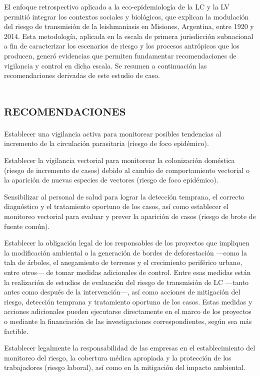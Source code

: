 \documentclass{article}
\begin{document}
El enfoque retrospectivo aplicado a la eco-epidemiología de la LC y la LV
permitió integrar los contextos sociales y biológicos, que explican la
modulación del riesgo de transmisión de la leishmaniasis en Misiones, Argentina,
entre 1920 y 2014. Esta metodología, aplicada en la escala de primera
jurisdicción subnacional a fin de caracterizar los escenarios de riesgo y los
procesos antrópicos que los producen, generó evidencias que permiten fundamentar
recomendaciones de vigilancia y control en dicha escala. Se resumen a
continuación las recomendaciones derivadas de este estudio de caso.

\section{\textsc{recomendaciones}}

Establecer una vigilancia activa para monitorear posibles tendencias al
incremento de la circulación parasitaria (riesgo de foco epidémico).

Establecer la vigilancia vectorial para monitorear la colonización doméstica
(riesgo de incremento de casos) debido al cambio de comportamiento vectorial o
la aparición de nuevas especies de vectores (riesgo de foco epidémico).

Sensibilizar al personal de salud para lograr la detección temprana, el correcto
diagnóstico y el tratamiento oportuno de los casos, así como establecer el
monitoreo vectorial para evaluar y prever la aparición de casos (riesgo de brote
de fuente común).

Establecer la obligación legal de los responsables de los proyectos que
impliquen la modificación ambiental o la generación de bordes de deforestación
—como la tala de árboles, el anegamiento de terrenos y el crecimiento periférico
urbano, entre otros— de tomar medidas adicionales de control. Entre esas medidas
están la realización de estudios de evaluación del riesgo de transmisión de LC
—tanto antes como después de la intervención—, así como acciones de mitigación
del riesgo, detección temprana y tratamiento oportuno de los casos. Estas
medidas y acciones adicionales pueden ejecutarse directamente en el marco de los
proyectos o mediante la financiación de las investigaciones correspondientes,
según sea más factible.

Establecer legalmente la responsabilidad de las empresas en el establecimiento
del monitoreo del riesgo, la cobertura médica apropiada y la protección de los
trabajadores (riesgo laboral), así como en la mitigación del impacto ambiental.
\end{document}
